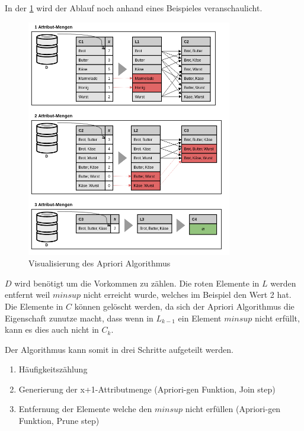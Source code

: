 In der \cref{fig:konzept:vorgehensweise:apriorialgorithmus} wird der Ablauf noch anhand eines Beispieles veranschaulicht.

\begin{figure}[H]
	\RawFloats
	\centering
	\includegraphics[width=0.8\textwidth]{images/Apriori-Algorithmus.png}
	\caption{Visualisierung des Apriori Algorithmus}
	\label{fig:konzept:vorgehensweise:apriorialgorithmus}
\end{figure}

$D$ wird benötigt um die Vorkommen zu zählen. Die roten Elemente in $L$ werden entfernt weil $minsup$ nicht erreicht wurde, welches im Beispiel den Wert 2 hat. Die Elemente in $C$ können gelöscht werden, da sich der Apriori Algorithmus die Eigenschaft zunutze macht, dass wenn in $L_{k-1}$ ein Element $minsup$ nicht erfüllt, kann es dies auch nicht in $C_k$.

Der Algorithmus kann somit in drei Schritte aufgeteilt werden.
\begin{enumerate}
\item Häufigkeitszählung
\item Generierung der x+1-Attributmenge (Apriori-gen Funktion, Join step)
\item Entfernung der Elemente welche den $minsup$ nicht erfüllen (Apriori-gen Funktion, Prune step)
\end{enumerate}

